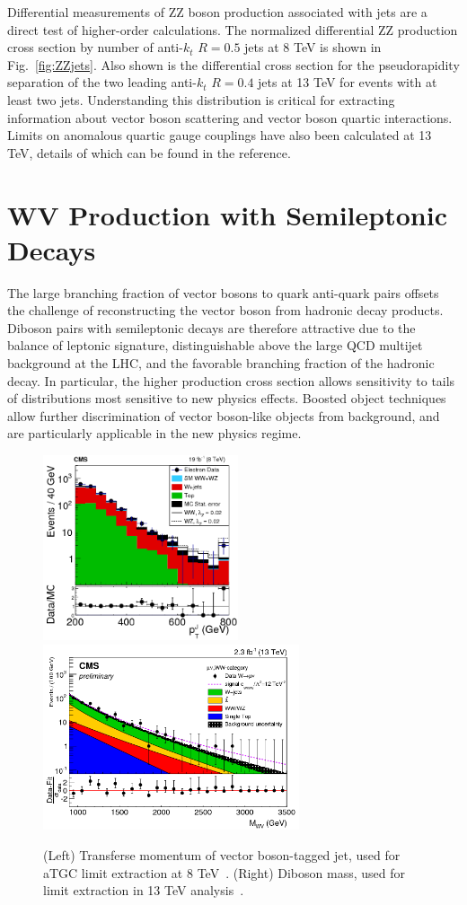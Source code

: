 \documentclass[10pt]{article}
\begin{document}
Differential measurements of ZZ boson production associated with jets are
a direct test of higher-order calculations. The normalized differential 
ZZ production cross section by number of anti-$k_{t}$ $R=0.5$ jets 
at 8 TeV is shown in Fig.~\ref{fig:ZZjets}. Also shown is the differential
cross section for the pseudorapidity separation of the two leading
anti-$k_{t}$ $R=0.4$ jets at 13 TeV for events with at least two jets.
Understanding this distribution is critical for extracting information
about vector boson scattering and vector boson quartic interactions.
Limits on anomalous quartic gauge couplings have also been calculated at 13 TeV, 
details of which can be found in the reference.

\section{WV Production with Semileptonic Decays}

The large branching fraction 
of vector bosons to quark anti-quark pairs offsets
the challenge of reconstructing the vector boson from
hadronic decay products. Diboson pairs with semileptonic decays
are therefore attractive due to the balance of leptonic signature, 
distinguishable above the large QCD multijet background at the LHC,
and the favorable branching fraction of the hadronic decay.
In particular, the higher production cross section
allows sensitivity to tails of distributions most sensitive to new physics
effects. Boosted object techniques allow further discrimination of
vector boson-like objects from background, and are particularly applicable
in the new physics regime.

\begin{figure}[htb]
  \centering
    \includegraphics[height=2.15in]{figures/WV8TeV_ptJ_aC.png}
    \includegraphics[height=2.15in]{figures/WV13TeV_mWW_aC.png}
  \caption{(Left) Transferse momentum of vector boson-tagged jet, used for
    aTGC limit extraction at 8 TeV~\cite{Sirunyan:2017bey}. (Right) Diboson mass, used for limit
    extraction in 13 TeV analysis~\cite{CMS:2016djf}. }
  \label{fig:WV}
\end{figure}
\end{document}
